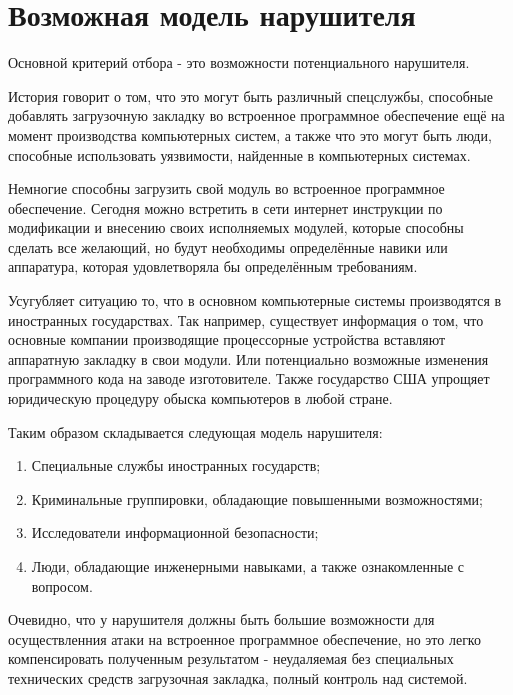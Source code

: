 \section{Возможная модель нарушителя}
Основной критерий отбора - это возможности потенциального нарушителя.

История говорит о том,
	что это могут быть различный спецслужбы,
		способные добавлять загрузочную закладку во встроенное программное обеспечение ещё на момент производства компьютерных систем,
	а также что это могут быть люди,
		способные использовать уязвимости,
	найденные в компьютерных системах.

Немногие способны загрузить свой модуль во встроенное программное обеспечение.
Сегодня можно встретить в сети интернет инструкции по модификации и внесению своих исполняемых модулей, которые способны сделать все желающий, но будут необходимы определённые навики или аппаратура, которая удовлетворяла бы определённым требованиям.

Усугубляет ситуацию то,
	что в основном компьютерные системы производятся в иностранных государствах.
Так например, существует информация о том, что основные компании производящие процессорные устройства вставляют аппаратную закладку в свои модули.
Или потенциально возможные изменения программного кода на заводе изготовителе.
Также государство США упрощяет юридическую процедуру обыска компьютеров в любой стране. \cite{news:USAcomp}

Таким образом складывается следующая модель нарушителя:
\begin{enumerate}
\item Специальные службы иностранных государств;
\item Криминальные группировки, обладающие повышенными возможностями;
\item Исследователи информационной безопасности;
\item Люди, обладающие инженерными навыками, а также ознакомленные с вопросом.
\end{enumerate}

Очевидно, что у нарушителя должны быть большие возможности для осуществленния атаки на встроенное программное обеспечение,
	но это легко компенсировать полученным результатом - неудаляемая без специальных технических средств загрузочная закладка, полный контроль над системой.
